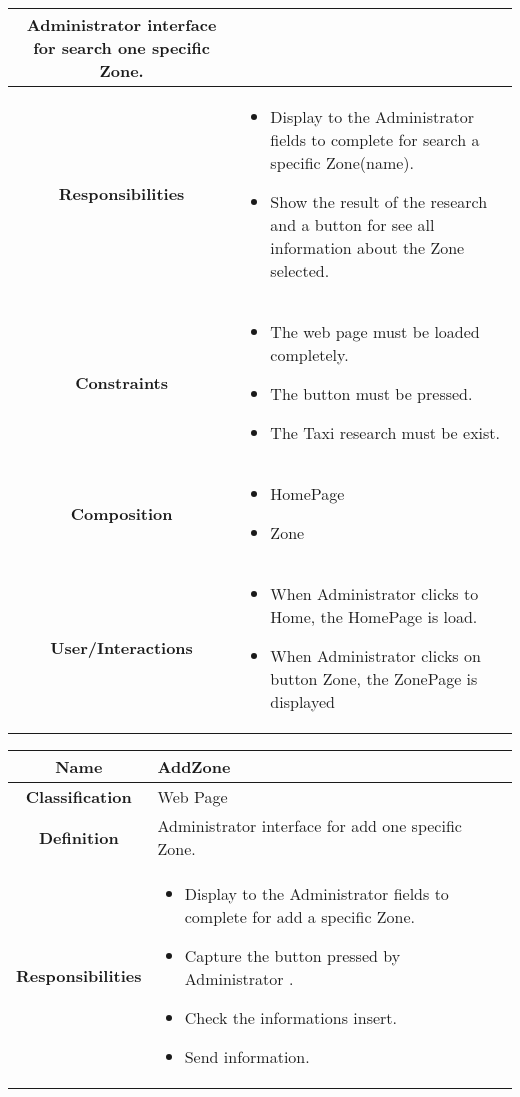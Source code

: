 \documentclass[11pt, a4paper,titlepage]{article}
\begin{document}
\begin{enumerate}
\begin{tabularx}{\textwidth}{| c | X |}
	Administrator interface for search one specific Zone.\\
	\hline
	\textbf{Responsibilities} &
	\begin{itemize}
		\item Display to the Administrator fields to complete for search a specific Zone(name).
		\item Show the result of the research and a button for see all information about the Zone selected.
	\end{itemize}
	\\
	\hline
	\textbf{Constraints} &
	\begin{itemize}
		\item  The web page must be loaded completely.
		\item The button must be pressed.
		\item The Taxi research must be exist.
	\end{itemize}
	\\
	\hline
	\textbf{Composition} &
	\begin{itemize}
		\item HomePage
		\item Zone
	\end{itemize}
	\\
	\hline
	\textbf{User/Interactions} &
	\begin{itemize}
		\item When Administrator clicks to Home, the HomePage is load.	
		\item When Administrator clicks on button Zone, the ZonePage is displayed
	\end{itemize}
	\\
	\hline 
\end{tabularx}
\begin{tabularx}{\textwidth}{| c | X |}
	\hline
	\textbf{Name} &
	AddZone
	\\
	\hline
	\textbf{Classification} &
	Web Page
	\\
	\hline
	\textbf{Definition} &
	Administrator interface for add one specific Zone.\\
	\hline
	\textbf{Responsibilities} &
	\begin{itemize}
		\item Display to the Administrator fields to complete for add a specific Zone.
		\item Capture the button pressed by Administrator .	
		\item Check the informations insert.
		\item Send information.

\end{itemize}
\end{tabularx}
\end{enumerate}
\end{document}
